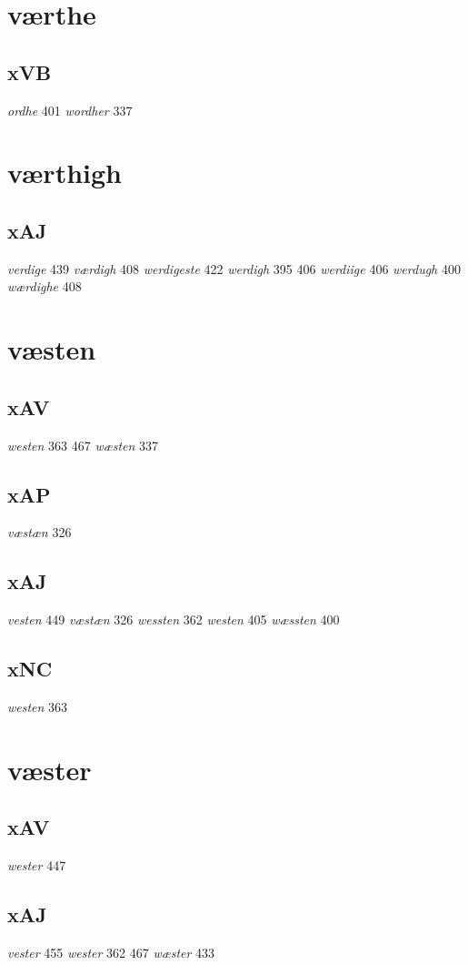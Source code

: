 \documentclass[a4paper,twocolumn]{article}
\begin{document}
\section{værthe}
\label{sec:org387b029}
\subsection{xVB}
\label{sec:org9c84a75}
\emph{ordhe} 401 \emph{wordher} 337 
\section{værthigh}
\label{sec:org194fce1}
\subsection{xAJ}
\label{sec:orgff74c01}
\emph{verdige} 439 \emph{værdigh} 408 \emph{werdigeste} 422 \emph{werdigh} 395 406 \emph{werdiige} 406 \emph{werdugh} 400 \emph{wærdighe} 408 
\section{væsten}
\label{sec:org5db2eba}
\subsection{xAV}
\label{sec:org0c97bec}
\emph{westen} 363 467 \emph{wæsten} 337 
\subsection{xAP}
\label{sec:org3b5fa0e}
\emph{væstæn} 326 
\subsection{xAJ}
\label{sec:orge4e43a3}
\emph{vesten} 449 \emph{væstæn} 326 \emph{wessten} 362 \emph{westen} 405 \emph{wæssten} 400 
\subsection{xNC}
\label{sec:org760b813}
\emph{westen} 363 
\section{væster}
\label{sec:org3ad656f}
\subsection{xAV}
\label{sec:org1ebd5f7}
\emph{wester} 447 
\subsection{xAJ}
\label{sec:org8b771eb}
\emph{vester} 455 \emph{wester} 362 467 \emph{wæster} 433 
\end{document}
